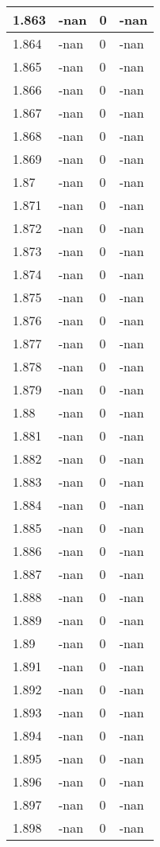 \documentclass[a4paper,14pt]{extarticle}
\begin{document}
\begin{longtable}{||m{3cm}||m{3cm}|m{3cm}||m{3cm}||}
\hline
1.863 & -nan & 0 & -nan\\
\hline
1.864 & -nan & 0 & -nan\\
\hline
1.865 & -nan & 0 & -nan\\
\hline
1.866 & -nan & 0 & -nan\\
\hline
1.867 & -nan & 0 & -nan\\
\hline
1.868 & -nan & 0 & -nan\\
\hline
1.869 & -nan & 0 & -nan\\
\hline
1.87 & -nan & 0 & -nan\\
\hline
1.871 & -nan & 0 & -nan\\
\hline
1.872 & -nan & 0 & -nan\\
\hline
1.873 & -nan & 0 & -nan\\
\hline
1.874 & -nan & 0 & -nan\\
\hline
1.875 & -nan & 0 & -nan\\
\hline
1.876 & -nan & 0 & -nan\\
\hline
1.877 & -nan & 0 & -nan\\
\hline
1.878 & -nan & 0 & -nan\\
\hline
1.879 & -nan & 0 & -nan\\
\hline
1.88 & -nan & 0 & -nan\\
\hline
1.881 & -nan & 0 & -nan\\
\hline
1.882 & -nan & 0 & -nan\\
\hline
1.883 & -nan & 0 & -nan\\
\hline
1.884 & -nan & 0 & -nan\\
\hline
1.885 & -nan & 0 & -nan\\
\hline
1.886 & -nan & 0 & -nan\\
\hline
1.887 & -nan & 0 & -nan\\
\hline
1.888 & -nan & 0 & -nan\\
\hline
1.889 & -nan & 0 & -nan\\
\hline
1.89 & -nan & 0 & -nan\\
\hline
1.891 & -nan & 0 & -nan\\
\hline
1.892 & -nan & 0 & -nan\\
\hline
1.893 & -nan & 0 & -nan\\
\hline
1.894 & -nan & 0 & -nan\\
\hline
1.895 & -nan & 0 & -nan\\
\hline
1.896 & -nan & 0 & -nan\\
\hline
1.897 & -nan & 0 & -nan\\
\hline
1.898 & -nan & 0 & -nan\\

\end{longtable}
\end{document}
